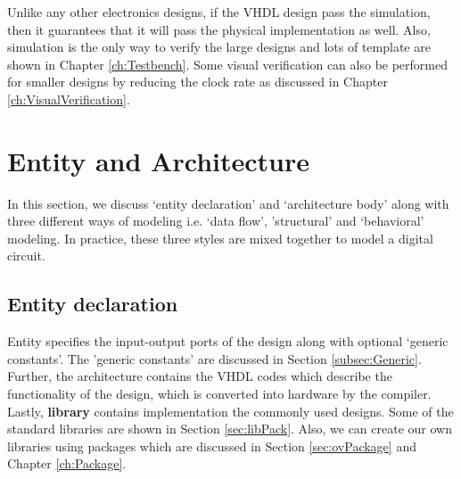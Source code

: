 %

\begin{noNumBox}
	Unlike any other electronics designs, if the VHDL design pass the simulation, then it guarantees that it will pass the physical implementation as well. Also, simulation is the only way to verify the large designs and lots of template are shown in Chapter \ref{ch:Testbench}. Some visual verification can also be performed for smaller designs by reducing the clock rate as discussed in Chapter \ref{ch:VisualVerification}.
\end{noNumBox}


\section{Entity and Architecture}
In this section, we discuss `entity declaration' and `architecture body' along with three different ways of modeling i.e. `data flow', 'structural' and `behavioral' modeling. In practice, these three styles are mixed together to model a digital circuit.  

\subsection{Entity declaration}
Entity specifies the input-output ports of the design along with optional `generic constants'. The 'generic constants' are discussed in Section \ref{subsec:Generic}. Further, the architecture contains the VHDL codes which describe the functionality of the design, which is converted into hardware by the compiler. Lastly, \textbf{library} contains implementation the commonly used designs. Some of the standard libraries are shown in Section \ref{sec:libPack}. Also, we can create our own libraries using packages which are discussed in Section \ref{sec:ovPackage} and Chapter \ref{ch:Package}. 

